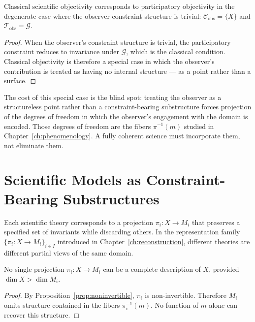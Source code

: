 \documentclass[11pt,openany]{book}
\begin{document}
\begin{proposition}
\label{prop:classical-special-case}
Classical scientific objectivity corresponds to
participatory objectivity in the degenerate case where the
observer constraint structure is trivial:
$\mathcal{C}_{\mathrm{obs}} = \{X\}$ and
$\mathcal{T}_{\mathrm{obs}} = \mathcal{G}$.
\end{proposition}

\begin{proof}
When the observer's constraint structure is trivial, the
participatory constraint reduces to invariance under
$\mathcal{G}$, which is the classical condition.
Classical objectivity is therefore a special case in which
the observer's contribution is treated as having no
internal structure — as a point rather than a surface.
\end{proof}

The cost of this special case is the blind spot: treating
the observer as a structureless point rather than a
constraint-bearing substructure forces projection of the
degrees of freedom in which the observer's engagement with
the domain is encoded.  Those degrees of freedom are the
fibers $\pi^{-1}(m)$ studied in
Chapter~\ref{ch:phenomenology}.  A fully coherent science
must incorporate them, not eliminate them.

\section{Scientific Models as Constraint-Bearing Substructures}
\label{sec:models-substructures}

Each scientific theory corresponds to a projection
$\pi_i : X \to M_i$ that preserves a specified set of
invariants while discarding others.  In the representation
family $\{\pi_i : X \to M_i\}_{i \in I}$ introduced in
Chapter~\ref{ch:reconstruction}, different theories are
different partial views of the same domain.

\begin{proposition}
\label{prop:incompleteness}
No single projection $\pi_i : X \to M_i$ can be a
complete description of $X$, provided $\dim X > \dim M_i$.
\end{proposition}

\begin{proof}
By Proposition~\ref{prop:noninvertible}, $\pi_i$ is
non-invertible.  Therefore $M_i$ omits structure contained
in the fibers $\pi_i^{-1}(m)$.  No function of $m$ alone
can recover this structure.
\end{proof}
\end{document}
